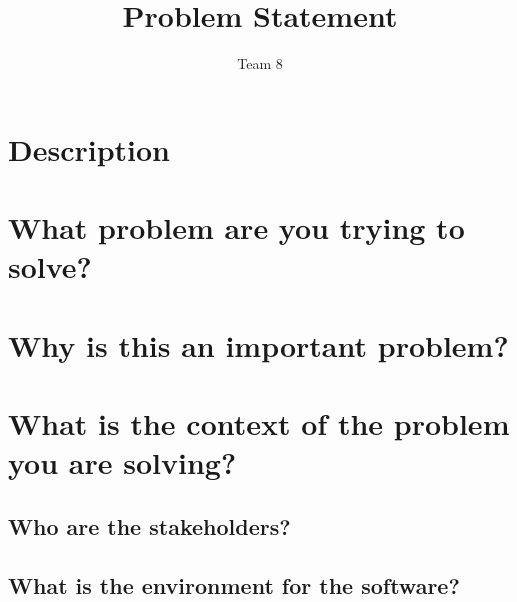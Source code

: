 \documentclass[12pt]{article}
\title{Problem Statement}
\author{Team 8}
\begin{document}
\maketitle

\section {Description}

\section {What problem are you trying to solve?}

\section {Why is this an important problem?}

\section {What is the context of the problem you are solving?}
    \subsection {Who are the stakeholders?}
    \subsection {What is the environment for the software?}
\end{document}
